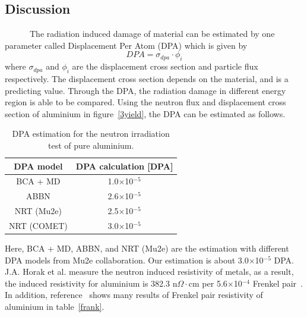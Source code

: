  \subsection{Discussion}
~~~~~~The radiation induced damage of material can be estimated by one parameter called Displacement Per Atom (DPA) which is given by
\begin{equation}
 DPA = \sigma_{dpa} \cdot \phi_i
\end{equation}
where $\sigma_{dpa}$ and $\phi_i$ are the displacement cross section and particle flux respectively.
The displacement cross section depends on the material, and is a predicting value.
Through the DPA, the radiation damage in different energy region is able to be compared.
Using the neutron flux and displacement cross section of aluminium in figure~\ref{3yield}, the DPA can be estimated as follows.
\begin{table}[H]
 \centering
 \begin{tabular}{cc} \hline \hline
  DPA model & DPA calculation [DPA] \\ \hline
  BCA + MD & 1.0$\times$10$^{-5}$ \\
  ABBN & 2.6$\times$10$^{-5}$ \\
  NRT (Mu2e) & 2.5$\times$10$^{-5}$ \\
  NRT (COMET) & 3.0$\times$10$^{-5}$ \\ \hline \hline
 \end{tabular}
 \caption{DPA estimation for the neutron irradiation test of pure aluminium.}
\end{table}
Here, BCA + MD, ABBN, and NRT (Mu2e) are the estimation with different DPA models from Mu2e collaboration.
Our estimation is about 3.0$\times$10$^{-5}$ DPA.
J.A. Horak et al. measure the neutron induced resistivity of metals, as a result, the induced resistivity for aluminium is 382.3 n$\Omega\cdot$cm per 5.6$\times$10$^{-4}$ Frenkel pair~\cite{horak}.
In addition, reference~\cite{yu} shows many results of Frenkel pair resistivity of aluminium in table~\ref{frank}.
